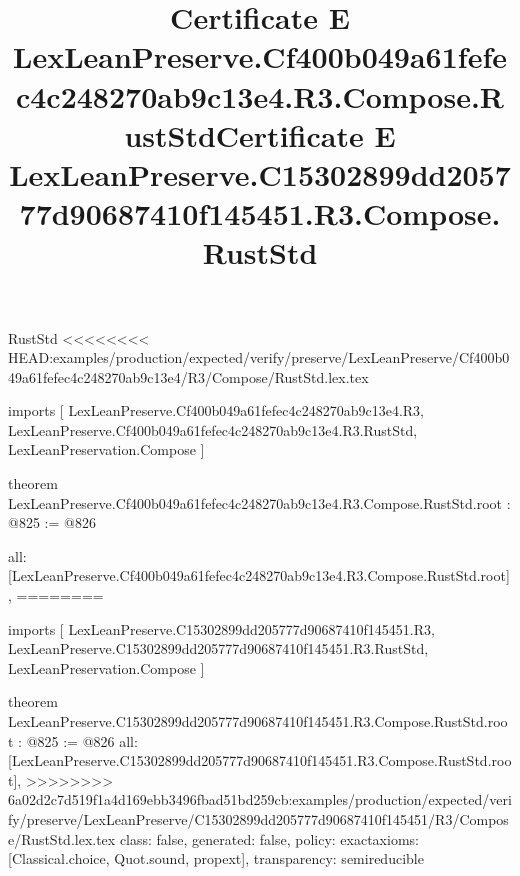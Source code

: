 \begin{lexlean}{RustStd}
<<<<<<<< HEAD:examples/production/expected/verify/preserve/LexLeanPreserve/Cf400b049a61fefec4c248270ab9c13e4/R3/Compose/RustStd.lex.tex
\title{Certificate E LexLeanPreserve.Cf400b049a61fefec4c248270ab9c13e4.R3.Compose.RustStd}
\begin{coremodule}
imports [
  LexLeanPreserve.Cf400b049a61fefec4c248270ab9c13e4.R3,
  LexLeanPreserve.Cf400b049a61fefec4c248270ab9c13e4.R3.RustStd,
  LexLeanPreservation.Compose
]

theorem LexLeanPreserve.Cf400b049a61fefec4c248270ab9c13e4.R3.Compose.RustStd.root : @825 := @826 {
  all: [LexLeanPreserve.Cf400b049a61fefec4c248270ab9c13e4.R3.Compose.RustStd.root],
========
\title{Certificate E LexLeanPreserve.C15302899dd205777d90687410f145451.R3.Compose.RustStd}
\begin{coremodule}
imports [
  LexLeanPreserve.C15302899dd205777d90687410f145451.R3,
  LexLeanPreserve.C15302899dd205777d90687410f145451.R3.RustStd,
  LexLeanPreservation.Compose
]

theorem LexLeanPreserve.C15302899dd205777d90687410f145451.R3.Compose.RustStd.root : @825 := @826 {
  all: [LexLeanPreserve.C15302899dd205777d90687410f145451.R3.Compose.RustStd.root],
>>>>>>>> 6a02d2c7d519f1a4d169ebb3496fbad51bd259cb:examples/production/expected/verify/preserve/LexLeanPreserve/C15302899dd205777d90687410f145451/R3/Compose/RustStd.lex.tex
  class: false,
  generated: false,
  policy: exact{axioms: [Classical.choice, Quot.sound, propext]},
  transparency: semireducible
}


\end{coremodule}}
\end{coremodule}
\end{lexlean}
